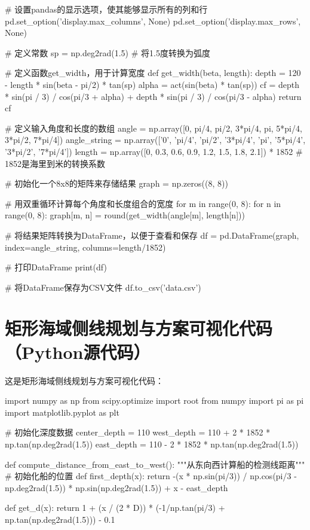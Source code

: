 \documentclass{cumcmthesis}
\begin{document}
\begin{appendices}
\begin{tcode}
# 设置pandas的显示选项，使其能够显示所有的列和行
pd.set_option('display.max_columns', None)
pd.set_option('display.max_rows', None)

# 定义常数
sp = np.deg2rad(1.5)  # 将1.5度转换为弧度

# 定义函数get_width，用于计算宽度
def get_width(beta, length):
    depth = 120 - length * sin(beta - pi/2) * tan(sp)
    alpha = act(sin(beta) * tan(sp))
    cf = depth * sin(pi / 3) / cos(pi/3 + alpha) + depth * sin(pi / 3) / cos(pi/3 - alpha)
    return cf

# 定义输入角度和长度的数组
angle = np.array([0, pi/4, pi/2, 3*pi/4, pi, 5*pi/4, 3*pi/2, 7*pi/4])
angle_string = np.array(['0', 'pi/4', 'pi/2', '3*pi/4', 'pi', '5*pi/4', '3*pi/2', '7*pi/4'])
length = np.array([0, 0.3, 0.6, 0.9, 1.2, 1.5, 1.8, 2.1]) * 1852  # 1852是海里到米的转换系数

# 初始化一个8x8的矩阵来存储结果
graph = np.zeros((8, 8))

# 用双重循环计算每个角度和长度组合的宽度
for m in range(0, 8):
    for n in range(0, 8):
        graph[m, n] = round(get_width(angle[m], length[n]))

# 将结果矩阵转换为DataFrame，以便于查看和保存
df = pd.DataFrame(graph, index=angle_string, columns=length/1852)

# 打印DataFrame
print(df)

# 将DataFrame保存为CSV文件
df.to_csv('data.csv')
\end{tcode}

\section{矩形海域侧线规划与方案可视化代码（Python源代码）}
\noindent 这是矩形海域侧线规划与方案可视化代码：
\begin{tcode}
import numpy as np
from scipy.optimize import root
from numpy import pi as pi
import matplotlib.pyplot as plt

# 初始化深度数据
center_depth = 110
west_depth = 110 + 2 * 1852 * np.tan(np.deg2rad(1.5))
east_depth = 110 - 2 * 1852 * np.tan(np.deg2rad(1.5))

def compute_distance_from_east_to_west():
    """从东向西计算船的检测线距离"""
    # 初始化船的位置
    def first_depth(x):
        return -(x * np.sin(pi/3)) / np.cos(pi/3 - np.deg2rad(1.5)) * np.sin(np.deg2rad(1.5)) + x - east_depth

    def get_d(x):
        return 1 + (x / (2 * D)) * (-1/np.tan(pi/3) + np.tan(np.deg2rad(1.5))) - 0.1


\end{tcode}
\end{appendices}
\end{document}
